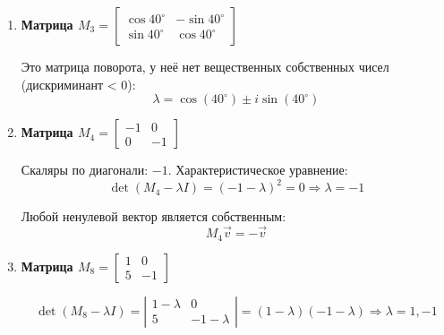 \begin{enumerate}
  Для $\lambda = 1$:
  \[
    \begin{bmatrix}
      0 & 0 \\
      3 & -1
    \end{bmatrix} \Rightarrow y = 3x \Rightarrow 
    v = \begin{bmatrix} 1 \\ 3 \end{bmatrix}
  \]

  Для $\lambda = 0$:
  \[
    \begin{bmatrix}
      1 & 0 \\
      3 & 0
    \end{bmatrix} \Rightarrow x = 0 \Rightarrow 
    v = \begin{bmatrix} 0 \\ 1 \end{bmatrix}
  \]

  \item \textbf{Матрица $M_3 = 
  \begin{bmatrix}
    \cos 40^\circ & -\sin 40^\circ \\
    \sin 40^\circ & \cos 40^\circ
  \end{bmatrix}$}

  Это матрица поворота, у неё нет вещественных собственных чисел (дискриминант < 0):
  \[
    \lambda = \cos(40^\circ) \pm i \sin(40^\circ)
  \]

  \item \textbf{Матрица $M_4 = 
  \begin{bmatrix}
    -1 & 0 \\
    0 & -1
  \end{bmatrix}$}

  Скаляры по диагонали: $-1$. Характеристическое уравнение:
  \[
    \det(M_4 - \lambda I) = (-1 - \lambda)^2 = 0 \Rightarrow \lambda = -1
  \]

  Любой ненулевой вектор является собственным:
  \[
    M_4 \vec{v} = -\vec{v}
  \]

  \item \textbf{Матрица $M_8 = 
  \begin{bmatrix}
    1 & 0 \\
    5 & -1
  \end{bmatrix}$}

  \[
    \det(M_8 - \lambda I) =
    \left| \begin{matrix}
      1 - \lambda & 0 \\
      5 & -1 - \lambda
    \end{matrix} \right| =
    (1 - \lambda)(-1 - \lambda)
  \Rightarrow \lambda = 1, -1
  \]


\end{enumerate}
